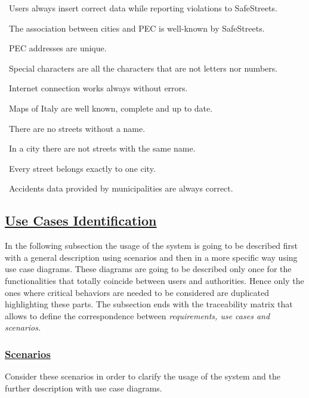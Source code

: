 \begin{description}
\begin{description}
					\item {}\ Users always insert correct data while reporting violations to SafeStreets.
					\item {}\ The association between cities and PEC is well-known by SafeStreets.
					\item {}\ PEC addresses are unique.
					\item {}\ Special characters are all the characters that are not letters nor numbers.
					\item {}\ Internet connection works always without errors.
					\item {}\ Maps of Italy are well known, complete and up to date.
					\item {}\ There are no streets without a name.
					\item {}\ In a city there are not streets with the same name.
					\item {}\ Every street belongs exactly to one city.
					\item {}\ Accidents data provided by municipalities are always correct.	
				\end{description}		
		\end{description}

\subsection[Use Cases Identification]{\hyperlink{toc}{Use Cases Identification}}
	In the following subsection the usage of the system is going to be described first with a general description using scenarios and then in a more specific way using use case diagrams. These diagrams are going to be described only once for the functionalities that totally coincide between users and authorities. Hence only the ones where critical behaviors are needed to be considered are duplicated highlighting these parts. The subsection ends with the traceability matrix that allows to define the correspondence between \emph{requirements, use cases and scenarios.}
	
	\subsubsection[Scenarios]{\hyperlink{toc}{Scenarios}}
		Consider these scenarios in order to clarify the usage of the system and the further description with use case diagrams.
		

